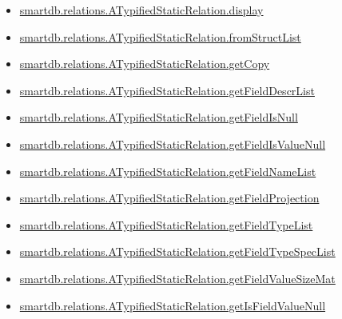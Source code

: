 \documentclass[letterpaper,10pt,english]{sphinxmanual}
\begin{document}
\begin{itemize}
\item {} 
{\hyperref[chap_func:smartdb-relations-atypifiedstaticrelation-display]{smartdb.relations.ATypifiedStaticRelation.display}}

\item {} 
{\hyperref[chap_func:smartdb-relations-atypifiedstaticrelation-fromstructlist]{smartdb.relations.ATypifiedStaticRelation.fromStructList}}

\item {} 
{\hyperref[chap_func:smartdb-relations-atypifiedstaticrelation-getcopy]{smartdb.relations.ATypifiedStaticRelation.getCopy}}

\item {} 
{\hyperref[chap_func:smartdb-relations-atypifiedstaticrelation-getfielddescrlist]{smartdb.relations.ATypifiedStaticRelation.getFieldDescrList}}

\item {} 
{\hyperref[chap_func:smartdb-relations-atypifiedstaticrelation-getfieldisnull]{smartdb.relations.ATypifiedStaticRelation.getFieldIsNull}}

\item {} 
{\hyperref[chap_func:smartdb-relations-atypifiedstaticrelation-getfieldisvaluenull]{smartdb.relations.ATypifiedStaticRelation.getFieldIsValueNull}}

\item {} 
{\hyperref[chap_func:smartdb-relations-atypifiedstaticrelation-getfieldnamelist]{smartdb.relations.ATypifiedStaticRelation.getFieldNameList}}

\item {} 
{\hyperref[chap_func:smartdb-relations-atypifiedstaticrelation-getfieldprojection]{smartdb.relations.ATypifiedStaticRelation.getFieldProjection}}

\item {} 
{\hyperref[chap_func:smartdb-relations-atypifiedstaticrelation-getfieldtypelist]{smartdb.relations.ATypifiedStaticRelation.getFieldTypeList}}

\item {} 
{\hyperref[chap_func:smartdb-relations-atypifiedstaticrelation-getfieldtypespeclist]{smartdb.relations.ATypifiedStaticRelation.getFieldTypeSpecList}}

\item {} 
{\hyperref[chap_func:smartdb-relations-atypifiedstaticrelation-getfieldvaluesizemat]{smartdb.relations.ATypifiedStaticRelation.getFieldValueSizeMat}}

\item {} 
{\hyperref[chap_func:smartdb-relations-atypifiedstaticrelation-getisfieldvaluenull]{smartdb.relations.ATypifiedStaticRelation.getIsFieldValueNull}}


\end{itemize}
\end{document}
